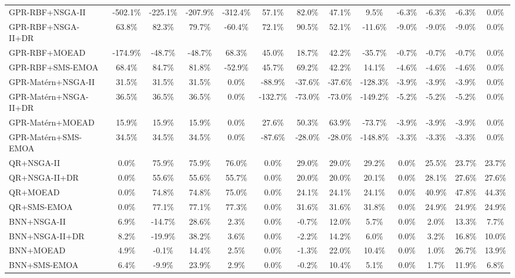\begin{table}[htbp]
{\begin{tabular}{l c c c c c c c c c c c c}
\hline
GPR-RBF+NSGA-II & -502.1\% & -225.1\% & -207.9\% & -312.4\% & 57.1\% & 82.0\% & 47.1\% & 9.5\% & -6.3\% & -6.3\% & -6.3\% & 0.0\% \\
GPR-RBF+NSGA-II+DR & 63.8\% & 82.3\% & 79.7\% & -60.4\% & 72.1\% & 90.5\% & 52.1\% & -11.6\% & -9.0\% & -9.0\% & -9.0\% & 0.0\% \\
GPR-RBF+MOEAD & -174.9\% & -48.7\% & -48.7\% & 68.3\% & 45.0\% & 18.7\% & 42.2\% & -35.7\% & -0.7\% & -0.7\% & -0.7\% & 0.0\% \\
GPR-RBF+SMS-EMOA & 68.4\% & 84.7\% & 81.8\% & -52.9\% & 45.7\% & 69.2\% & 42.2\% & 14.1\% & -4.6\% & -4.6\% & -4.6\% & 0.0\% \\
GPR-Mat\'ern+NSGA-II & 31.5\% & 31.5\% & 31.5\% & 0.0\% & -88.9\% & -37.6\% & -37.6\% & -128.3\% & -3.9\% & -3.9\% & -3.9\% & 0.0\% \\
GPR-Mat\'ern+NSGA-II+DR & 36.5\% & 36.5\% & 36.5\% & 0.0\% & -132.7\% & -73.0\% & -73.0\% & -149.2\% & -5.2\% & -5.2\% & -5.2\% & 0.0\% \\
GPR-Mat\'ern+MOEAD & 15.9\% & 15.9\% & 15.9\% & 0.0\% & 27.6\% & 50.3\% & 63.9\% & -73.7\% & -3.9\% & -3.9\% & -3.9\% & 0.0\% \\
GPR-Mat\'ern+SMS-EMOA & 34.5\% & 34.5\% & 34.5\% & 0.0\% & -87.6\% & -28.0\% & -28.0\% & -148.8\% & -3.3\% & -3.3\% & -3.3\% & 0.0\% \\
QR+NSGA-II & 0.0\% & 75.9\% & 75.9\% & 76.0\% & 0.0\% & 29.0\% & 29.0\% & 29.2\% & 0.0\% & 25.5\% & 23.7\% & 23.7\% \\
QR+NSGA-II+DR & 0.0\% & 55.6\% & 55.6\% & 55.7\% & 0.0\% & 20.0\% & 20.0\% & 20.1\% & 0.0\% & 28.1\% & 27.6\% & 27.6\% \\
QR+MOEAD & 0.0\% & 74.8\% & 74.8\% & 75.0\% & 0.0\% & 24.1\% & 24.1\% & 24.1\% & 0.0\% & 40.9\% & 47.8\% & 44.3\% \\
QR+SMS-EMOA & 0.0\% & 77.1\% & 77.1\% & 77.3\% & 0.0\% & 31.6\% & 31.6\% & 31.8\% & 0.0\% & 24.9\% & 24.9\% & 24.9\% \\
BNN+NSGA-II & 6.9\% & -14.7\% & 28.6\% & 2.3\% & 0.0\% & -0.7\% & 12.0\% & 5.7\% & 0.0\% & 2.0\% & 13.3\% & 7.7\% \\
BNN+NSGA-II+DR & 8.2\% & -19.9\% & 38.2\% & 3.6\% & 0.0\% & -2.2\% & 14.2\% & 6.0\% & 0.0\% & 3.2\% & 16.8\% & 10.0\% \\
BNN+MOEAD & 4.9\% & -0.1\% & 14.4\% & 2.5\% & 0.0\% & -1.3\% & 22.0\% & 10.4\% & 0.0\% & 1.0\% & 26.7\% & 13.9\% \\
BNN+SMS-EMOA & 6.4\% & -9.9\% & 23.9\% & 2.9\% & 0.0\% & -0.2\% & 10.4\% & 5.1\% & 0.0\% & 1.7\% & 11.9\% & 6.8\% \\

\end{tabular}}
\end{table}
